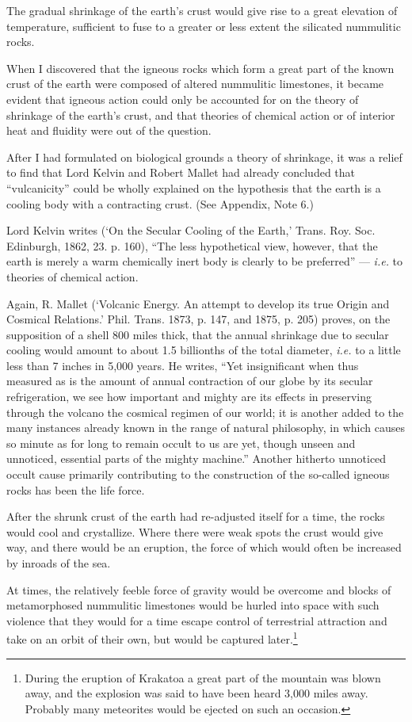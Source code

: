 \documentclass[a4paper, 12pt, oneside]{article}
\begin{document}
The gradual shrinkage of the earth's crust would give rise to a great elevation of temperature, sufficient to fuse to a greater or less extent the silicated nummulitic rocks.

When I discovered that the igneous rocks which form a great part of the known crust of the earth were composed of altered nummulitic limestones, it became evident that igneous action could only be accounted for on the theory of shrinkage of the earth's crust, and that theories of chemical action or of interior heat and fluidity were out of the question.

After I had formulated on biological grounds a theory of shrinkage, it was a relief to find that Lord Kelvin and Robert Mallet had already concluded that ``vulcanicity'' could be wholly explained on the hypothesis that the earth is a cooling body with a contracting crust. (See Appendix, Note 6.)

Lord Kelvin writes (`On the Secular Cooling of the Earth,' Trans. Roy. Soc. Edinburgh, 1862, 23. p. 160), ``The less hypothetical view, however, that the earth is merely a warm chemically inert body is clearly to be preferred'' --- \emph{i.e.} to theories of chemical action.

Again, R. Mallet (`Volcanic Energy. An attempt to develop its true Origin and Cosmical Relations.' Phil. Trans. 1873, p. 147, and 1875, p. 205) proves, on the supposition of a shell 800 miles thick, that the annual shrinkage due to secular cooling would amount to about 1.5 billionths of the total diameter, \emph{i.e.} to a little less than 7 inches in 5,000 years. He writes, ``Yet insignificant when thus measured as is the amount of annual contraction of our globe by its secular refrigeration, we see how important and mighty are its effects in preserving through the volcano the cosmical regimen of our world; it is another added to the many instances already known in the range of natural philosophy, in which causes so minute as for long to remain occult to us are yet, though unseen and unnoticed, essential parts of the mighty machine.'' Another hitherto unnoticed occult cause primarily contributing to the construction of the so-called igneous rocks has been the life force.

After the shrunk crust of the earth had re-adjusted itself for a time, the rocks would cool and crystallize. Where there were weak spots the crust would give way, and there would be an eruption, the force of which would often be increased by inroads of the sea.

At times, the relatively feeble force of gravity would be overcome and blocks of metamorphosed nummulitic limestones would be hurled into space with such violence that they would for a time escape control of terrestrial attraction and take on an orbit of their own, but would be captured later.\footnote{During the eruption of Krakatoa a great part of the mountain was blown away, and the explosion was said to have been heard 3,000 miles away. Probably many meteorites would be ejected on such an occasion.}
\end{document}
